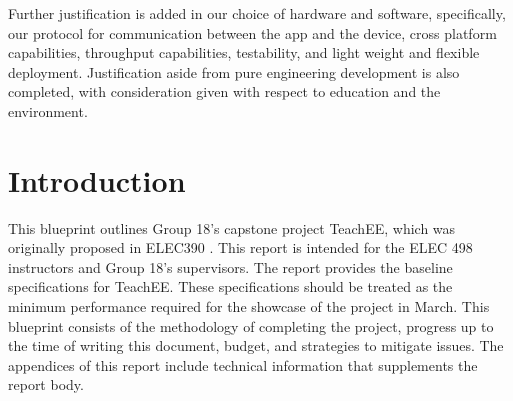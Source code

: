 \documentclass[letterpaper,12pt]{article}
\begin{document}
Further justification is added in our choice of hardware and software,
specifically, our protocol for communication between the app and the device,
cross platform capabilities, throughput capabilities, testability, and light weight and
flexible deployment.  Justification aside from pure
engineering development is also completed, with consideration given with respect
to education and the\\environment.

\tableofcontents
\listoffigures
\listoftables
\newpage
{}
\section{Introduction} \label{sec:intro} %
This blueprint outlines Group 18's capstone project TeachEE, which was
originally proposed in ELEC390 \cite{prop_390}. This report is intended for the
ELEC 498 instructors and Group 18's supervisors. The report provides the
baseline specifications for TeachEE. These specifications should be treated as
the minimum performance required for the showcase of the project in March. This
blueprint consists of the methodology of completing the project, progress up to
the time of writing this document, budget, and strategies to mitigate issues.
The appendices of this report include technical information that supplements the
report body.

\end{document}
